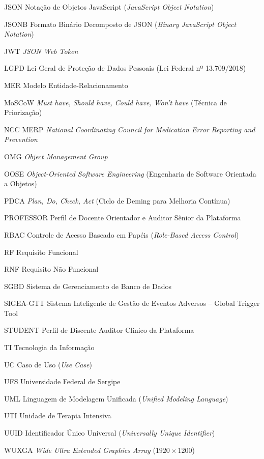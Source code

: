 \begin{siglas}
    \item[JSON] Notação de Objetos JavaScript (\textit{JavaScript Object Notation})
    \item[JSONB] Formato Binário Decomposto de JSON (\textit{Binary JavaScript Object Notation})
    \item[JWT] \textit{JSON Web Token}
    \item[LGPD] Lei Geral de Proteção de Dados Pessoais (Lei Federal nº 13.709/2018)
    \item[MER] Modelo Entidade-Relacionamento
    \item[MoSCoW] \textit{Must have, Should have, Could have, Won't have} (Técnica de Priorização)
    \item[NCC MERP] \textit{National Coordinating Council for Medication Error Reporting and Prevention}
    \item[OMG] \textit{Object Management Group}
    \item[OOSE] \textit{Object-Oriented Software Engineering} (Engenharia de Software Orientada a Objetos)
    \item[PDCA] \textit{Plan, Do, Check, Act} (Ciclo de Deming para Melhoria Contínua)
    \item[PROFESSOR] Perfil de Docente Orientador e Auditor Sênior da Plataforma
    \item[RBAC] Controle de Acesso Baseado em Papéis (\textit{Role-Based Access Control})
    \item[RF] Requisito Funcional
    \item[RNF] Requisito Não Funcional
    \item[SGBD] Sistema de Gerenciamento de Banco de Dados
    \item[SIGEA-GTT] Sistema Inteligente de Gestão de Eventos Adversos -- Global Trigger Tool
    \item[STUDENT] Perfil de Discente Auditor Clínico da Plataforma
    \item[TI] Tecnologia da Informação
    \item[UC] Caso de Uso (\textit{Use Case})
    \item[UFS] Universidade Federal de Sergipe
    \item[UML] Linguagem de Modelagem Unificada (\textit{Unified Modeling Language})
    \item[UTI] Unidade de Terapia Intensiva
    \item[UUID] Identificador Único Universal (\textit{Universally Unique Identifier})
    \item[WUXGA] \textit{Wide Ultra Extended Graphics Array} ($1920 \times 1200$)
\end{siglas}
